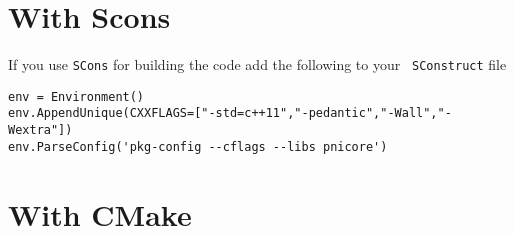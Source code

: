 \section{With Scons}

If you use {\tt SCons} for building the code add the following to your {\tt
SConstruct} file
\begin{verbatim}
env = Environment()
env.AppendUnique(CXXFLAGS=["-std=c++11","-pedantic","-Wall","-Wextra"])
env.ParseConfig('pkg-config --cflags --libs pnicore')
\end{verbatim}

\section{With CMake}
